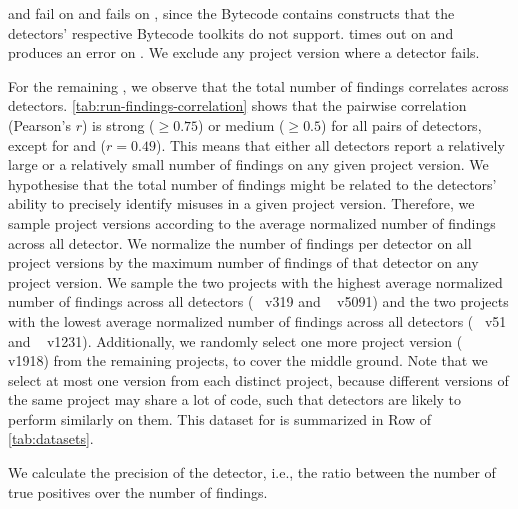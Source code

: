 

\Jadet and \Tikanga fail on  and \DMMC fails on , since the Bytecode contains constructs that the detectors' respective Bytecode toolkits do not support.
\GROUMiner times out on  and produces an error on .
We exclude any project version where a detector fails.

For the remaining , we observe that the total number of findings correlates across detectors.
\autoref{tab:run-findings-correlation} shows that the pairwise correlation (Pearson's $r$) is strong ($\geq 0.75$) or medium ($\geq 0.5$) for all pairs of detectors, except for \Jadet and \GROUMiner ($r = 0.49$).
This means that either all detectors report a relatively large or a relatively small number of findings on any given project version.
We hypothesise that the total number of findings might be related to the detectors' ability to precisely identify misuses in a given project version.
Therefore, we sample project versions according to the average normalized number of findings across all detector.
We normalize the number of findings per detector on all project versions by the maximum number of findings of that detector on any project version.
We sample the two projects with the highest average normalized number of findings across all detectors (~\cite{closure} v319 and ~\cite{itext} v5091) and the two projects with the lowest average normalized number of findings across all detectors (~\cite{jmrtd} v51 and ~\cite{jodatime} v1231).
Additionally, we randomly select one more project version (~\cite{lucene} v1918) from the remaining projects, to cover the middle ground.
%
Note that we select at most one version from each distinct project, because different versions of the same project may share a lot of code, such that detectors are likely to perform similarly on them.
%
This dataset for  is summarized in Row  of \autoref{tab:datasets}.

We calculate the precision of the detector, i.e., the ratio between the number of true positives over the number of findings.

